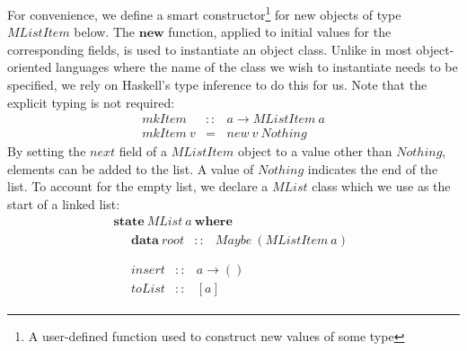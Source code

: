 For convenience, we define a smart constructor\footnote{A user-defined function used to construct new values of some type} for new objects of type $\mathit{MListItem}$ below. The $\mathbf{new}$ function, applied to initial values for the corresponding fields, is used to instantiate an object class. Unlike in most object-oriented languages where the name of the class we wish to instantiate needs to be specified, we rely on Haskell's type inference to do this for us. Note that the explicit typing is not required:
\begin{displaymath}
\begin{array}{lcl}
\mathit{mkItem} & :: & a \to \mathit{MListItem}~a \\
\mathit{mkItem}~v & = & \mathit{new}~v~\mathit{Nothing}
\end{array}
\end{displaymath}
By setting the $\mathit{next}$ field of a $\mathit{MListItem}$ object to a value other than $\mathit{Nothing}$, elements can be added to the list. A value of $\mathit{Nothing}$ indicates the end of the list. To account for the empty list, we declare a $\mathit{MList}$ class which we use as the start of a linked list:
\begin{displaymath}
\begin{array}{l}
\mathbf{state}~\mathit{MList}~a~\mathbf{where} \\
\quad \begin{array}{lcl}
\mathbf{data}~\mathit{root}  & :: & \mathit{Maybe}~(\mathit{MListItem}~a)
\end{array}\\\\
\quad \begin{array}{lcl}
\mathit{insert} & :: & a \to () \\
\mathit{toList} & :: & [a]
\end{array}
\end{array}
\end{displaymath}
